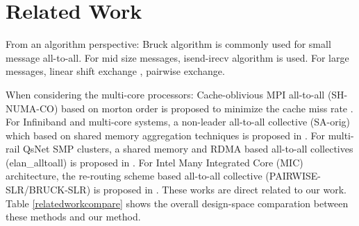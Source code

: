 \section{Related Work}

From an algorithm perspective: Bruck algorithm \cite{bruck1997efficient} is commonly used for small message all-to-all. For mid size messages, isend-irecv algorithm is used. For large messages, linear shift exchange \cite{ranka1994static}, pairwise exchange\cite{thakur2005optimization}.

When considering the multi-core processors:  
Cache-oblivious MPI all-to-all (SH-NUMA-CO) based on morton order is proposed to minimize the cache miss rate \cite{li2017cache}.
For Infiniband and multi-core systems, a non-leader all-to-all collective (SA-orig) which based on shared memory aggregation techniques is proposed in \cite{kumar2008scaling}.
For multi-rail QsNet SMP clusters, a shared memory and RDMA based all-to-all collectives (elan\_alltoall) is proposed in \cite{qian2008efficient}.
For Intel Many Integrated Core (MIC) architecture,  the re-routing scheme based all-to-all collective (PAIRWISE-SLR/BRUCK-SLR) is proposed in \cite{venkatesh2014high}. 
These works are direct related to our work. 
Table \ref{relatedworkcompare} shows the overall design-space comparation between these methods and our method.


